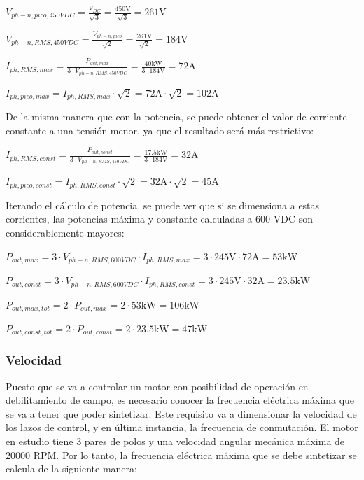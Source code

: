\(V_{ph-n, pico, 450 VDC} = \frac{V_{DC}}{\sqrt{3}} = \frac{450 \text{V}}{\sqrt{3}} = 261 \text{V}\)

\(V_{ph-n, RMS, 450 VDC} = \frac{V_{ph-n, pico}}{\sqrt{2}} = \frac{261 \text{V}}{\sqrt{2}} = 184 \text{V}\)


\(I_{ph, RMS, max} = \frac{P_{out, max}}{3\cdot V_{ph-n, RMS, 450 VDC}} = \frac{40 \text{kW}}{3\cdot184 \text{V}} = 72 \text{A}\)

\(I_{ph, pico, max} = I_{ph, RMS, max}\cdot\sqrt{2} = 72\text{A} \cdot\sqrt{2} = 102 \text{A}\)

De la misma manera que con la potencia, se puede obtener el valor de corriente constante a una tensión menor, ya que el resultado será más restrictivo:

\(I_{ph, RMS, const} = \frac{P_{out, const}}{3\cdot V_{ph-n, RMS, 450 VDC}} = \frac{17.5 \text{kW}}{3\cdot184 \text{V}} = 32 \text{A}\)

\(I_{ph, pico, const} = I_{ph, RMS, const}\cdot\sqrt{2} = 32 \text{A}\cdot\sqrt{2} = 45 \text{A}\)


Iterando el cálculo de potencia, se puede ver que si se dimensiona a estas corrientes, las potencias máxima y constante calculadas a 600 VDC son considerablemente mayores:

\(P_{out, max} = 3\cdot V_{ph-n, RMS, 600 VDC}\cdot I_{ph, RMS, max} = 3\cdot245 \text{V}\cdot 72 \text{A} = 53 \text{kW}\)

\(P_{out, const} = 3\cdot V_{ph-n, RMS, 600 VDC}\cdot I_{ph, RMS, const} = 3\cdot245 \text{V}\cdot 32 \text{A} = 23.5 \text{kW}\)

\(P_{out, max, tot} = 2\cdot P_{out, max} = 2\cdot53 \text{kW} = 106 \text{kW}\)

\(P_{out, const, tot} = 2\cdot P_{out, const} = 2\cdot23.5 \text{kW} = 47 \text{kW}\)


\subsubsection{Velocidad}
Puesto que se va a controlar un motor con posibilidad de operación en debilitamiento de campo, es necesario conocer la frecuencia eléctrica máxima que se va a tener que poder sintetizar. Este requisito va a dimensionar la velocidad de los lazos de control, y en última instancia, la frecuencia de conmutación. El motor en estudio tiene 3 pares de polos y una velocidad angular mecánica máxima de 20000 RPM. Por lo tanto, la frecuencia eléctrica máxima que se debe sintetizar se calcula de la siguiente manera:

